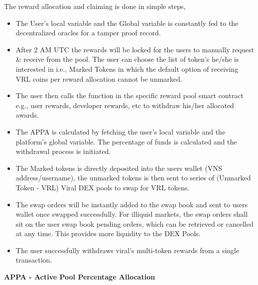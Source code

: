 \documentclass[conference]{IEEEtran}
\begin{document}
The reward allocation and claiming is done in simple steps,
\begin{itemize}[wide, labelwidth=!, labelindent=0pt]
\item The User's local variable and the Global variable is constantly fed to the decentralized oracles for a tamper proof record.  
\item After 2 AM UTC the rewards will be locked for the users to manually request \& receive from the pool. The user can choose the list of token's he/she is interested in i.e., Marked Tokens in which the default option of receiving VRL coins per reward allocation cannot be unmarked.
\item The user then calls the function in the specific reward pool smart contract e.g., user rewards, developer rewards, etc to withdraw his/her allocated awards.
\item The APPA is calculated by fetching the user's local variable and the platform's global variable. The percentage of funds is calculated and the withdrawal process is initiated.
\item The Marked tokens is directly deposited into the users wallet (VNS address/username), the unmarked tokens is then sent to series of (Unmarked Token - VRL) Viral DEX pools to swap for VRL tokens. 
\item The swap orders will be instantly added to the swap book and sent to users wallet once swapped successfully. For illiquid markets, the swap orders shall sit on the user swap book pending orders, which can be retrieved or cancelled at any time. This provides more liquidity to the DEX Pools.
\item The user successfully withdraws viral's multi-token rewards from a single transaction.
\end{itemize}

\textbf{APPA - Active Pool Percentage Allocation }\\
\end{document}
